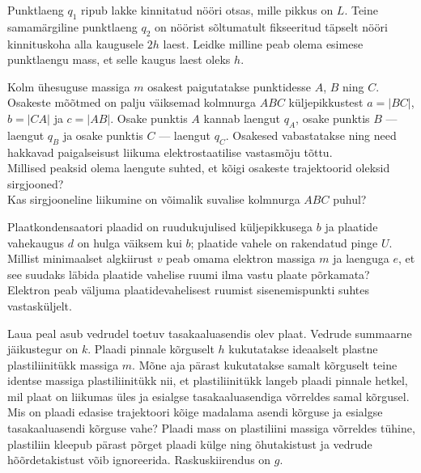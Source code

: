 \documentclass[10pt]{article}
\begin{document}
Punktlaeng $q_1$ ripub lakke kinnitatud nööri otsas, mille pikkus on $L$. Teine samamärgiline punktlaeng $q_2$ on nöörist sõltumatult fikseeritud täpselt nööri kinnituskoha alla kaugusele $2h$ laest. Leidke milline peab olema esimese punktlaengu mass, et selle kaugus laest oleks $h$.
\probend
\bigskip


Kolm ühesuguse massiga $m$ osakest paigutatakse punktidesse $A$, $B$ ning $C$. Osakeste mõõtmed on palju väiksemad kolmnurga $ABC$ küljepikkustest $a=|BC|$, $b=|CA|$ ja $c=|AB|$. Osake punktis $A$ kannab laengut $q_A$, osake punktis $B$ --- laengut $q_B$ ja osake punktis $C$ --- laengut $q_C$. Osakesed vabastatakse ning need hakkavad paigalseisust liikuma elektrostaatilise vastasmõju tõttu.\\
\osa Millised peaksid olema laengute suhted, et kõigi osakeste trajektoorid oleksid sirgjooned?\\
\osa Kas sirgjooneline liikumine on võimalik suvalise kolmnurga $ABC$ puhul?
\probend
\bigskip


Plaatkondensaatori plaadid on ruudukujulised küljepikkusega $b$ ja plaatide vahekaugus $d$ on hulga väiksem kui $b$; plaatide vahele on rakendatud pinge $U$. Millist minimaalset algkiirust $v$ peab omama elektron massiga $m$ ja laenguga $e$, et see suudaks läbida plaatide vahelise ruumi ilma vastu plaate põrkamata? Elektron peab väljuma plaatidevahelisest ruumist sisenemispunkti suhtes vastasküljelt.
\probend
\bigskip


Laua peal asub vedrudel toetuv tasakaaluasendis olev plaat. Vedrude summaarne jäikustegur on $k$. Plaadi pinnale kõrguselt $h$ kukutatakse ideaalselt plastne plastiliinitükk massiga $m$. Mõne aja pärast kukutatakse samalt kõrguselt teine identse massiga plastiliinitükk nii, et plastiliinitükk langeb plaadi pinnale hetkel, mil plaat on liikumas üles ja esialgse tasakaaluasendiga võrreldes samal kõrgusel. Mis on plaadi edasise trajektoori kõige madalama asendi kõrguse ja esialgse tasakaaluasendi kõrguse vahe? Plaadi mass on plastiliini massiga võrreldes tühine, plastiliin kleepub pärast põrget plaadi külge ning õhutakistust ja vedrude hõõrdetakistust võib ignoreerida. Raskuskiirendus on $g$.
\probend
\bigskip
\end{document}
